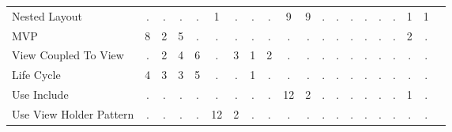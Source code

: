 \begin{table*}[t]
\begin{tabular}{p{4cm}|p{.3cm}p{.3cm}p{.3cm}p{.3cm}p{.3cm}p{.3cm}p{.3cm}p{.3cm}p{.3cm}p{.4cm}p{.4cm}p{.4cm}p{.4cm}p{.4cm}p{.4cm}p{.4cm}p{.4cm}p{.4cm}p{.4cm}}
Nested Layout								& \multicolumn{1}{c}{.}	& \multicolumn{1}{c}{.}	& \multicolumn{1}{c}{.}	& \multicolumn{1}{c}{.}	& \multicolumn{1}{c}{1}	& \multicolumn{1}{c}{.}	& \multicolumn{1}{c}{.}	& \multicolumn{1}{c}{.}	& \multicolumn{1}{c}{9}	& \multicolumn{1}{c}{9}	& \multicolumn{1}{c}{.}	& \multicolumn{1}{c}{.}	& \multicolumn{1}{c}{.}	& \multicolumn{1}{c}{.}	& \multicolumn{1}{c}{.}	& \multicolumn{1}{c}{.}	& \multicolumn{1}{c}{1}	& \multicolumn{1}{c}{1} 		 \\
MVP											& \multicolumn{1}{c}{8}	& \multicolumn{1}{c}{2}	& \multicolumn{1}{c}{5}	& \multicolumn{1}{c}{.}	& \multicolumn{1}{c}{.}	& \multicolumn{1}{c}{.}	& \multicolumn{1}{c}{.}	& \multicolumn{1}{c}{.}	& \multicolumn{1}{c}{.}	& \multicolumn{1}{c}{.}	& \multicolumn{1}{c}{.}	& \multicolumn{1}{c}{.}	& \multicolumn{1}{c}{.}	& \multicolumn{1}{c}{.}	& \multicolumn{1}{c}{.}	& \multicolumn{1}{c}{.}	& \multicolumn{1}{c}{2}	& \multicolumn{1}{c}{.} 		 \\
View Coupled To View						& \multicolumn{1}{c}{.}	& \multicolumn{1}{c}{2}	& \multicolumn{1}{c}{4}	& \multicolumn{1}{c}{6}	& \multicolumn{1}{c}{.}	& \multicolumn{1}{c}{3}	& \multicolumn{1}{c}{1}	& \multicolumn{1}{c}{2}	& \multicolumn{1}{c}{.}	& \multicolumn{1}{c}{.}	& \multicolumn{1}{c}{.}	& \multicolumn{1}{c}{.}	& \multicolumn{1}{c}{.}	& \multicolumn{1}{c}{.}	& \multicolumn{1}{c}{.}	& \multicolumn{1}{c}{.}	& \multicolumn{1}{c}{.}	& \multicolumn{1}{c}{.} 		 \\
Life Cycle									& \multicolumn{1}{c}{4}	& \multicolumn{1}{c}{3}	& \multicolumn{1}{c}{3}	& \multicolumn{1}{c}{5}	& \multicolumn{1}{c}{.}	& \multicolumn{1}{c}{.}	& \multicolumn{1}{c}{1}	& \multicolumn{1}{c}{.}	& \multicolumn{1}{c}{.}	& \multicolumn{1}{c}{.}	& \multicolumn{1}{c}{.}	& \multicolumn{1}{c}{.}	& \multicolumn{1}{c}{.}	& \multicolumn{1}{c}{.}	& \multicolumn{1}{c}{.}	& \multicolumn{1}{c}{.}	& \multicolumn{1}{c}{.}	& \multicolumn{1}{c}{.} 		 \\
Use Include									& \multicolumn{1}{c}{.}	& \multicolumn{1}{c}{.}	& \multicolumn{1}{c}{.}	& \multicolumn{1}{c}{.}	& \multicolumn{1}{c}{.}	& \multicolumn{1}{c}{.}	& \multicolumn{1}{c}{.}	& \multicolumn{1}{c}{.}	& \multicolumn{1}{c}{12}	& \multicolumn{1}{c}{2}	& \multicolumn{1}{c}{.}	& \multicolumn{1}{c}{.}	& \multicolumn{1}{c}{.}	& \multicolumn{1}{c}{.}	& \multicolumn{1}{c}{.}	& \multicolumn{1}{c}{.}	& \multicolumn{1}{c}{1}	& \multicolumn{1}{c}{.} 	 \\
Use View Holder Pattern						& \multicolumn{1}{c}{.}	& \multicolumn{1}{c}{.}	& \multicolumn{1}{c}{.}	& \multicolumn{1}{c}{.}	& \multicolumn{1}{c}{12}	& \multicolumn{1}{c}{2}	& \multicolumn{1}{c}{.}	& \multicolumn{1}{c}{.}	& \multicolumn{1}{c}{.}	& \multicolumn{1}{c}{.}	& \multicolumn{1}{c}{.}	& \multicolumn{1}{c}{.}	& \multicolumn{1}{c}{.}	& \multicolumn{1}{c}{.}	& \multicolumn{1}{c}{.}	& \multicolumn{1}{c}{.}	& \multicolumn{1}{c}{.}	& \multicolumn{1}{c}{.} 	 \\

\end{tabular}
\end{table*}
